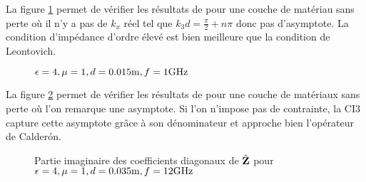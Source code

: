       La figure \ref{fig:imp_fourier:plan:hoppe:33:hoibc} permet de vérifier les résultats de \cite[p.~33]{hoppe_impedance_1995} pour une couche de matériau sans perte où il n'y a pas de \(k_x\) réel tel que \(k_3d=\frac{\pi}{2} + n \pi\) donc pas d'asymptote.
      La condition d'impédance d'ordre élevé est bien meilleure que la condition de Leontovich.
      \begin{figure}[!hbt]
        \centering
        
        \caption[Partie imaginaire de l'opérateur de Calderón, comparé avec les approximations CI0, CI3 pour une couche plane de matériau de Hoppe \& Rahmat-Samii, avec ondes évanescentes]{\(\epsilon = 4, \mu = 1, d=0.015\text{m}, f=1\text{GHz}\)}
        \label{fig:imp_fourier:plan:hoppe:33:hoibc}
      \end{figure}
      \begin{table}[!hbt]
        \centering
        \caption{Coefficients associés à la figure \ref{fig:imp_fourier:plan:hoppe:33:hoibc}}
        \label{tab:imp_fourier:plan:hoppe:33:hoibc}
      \end{table}

      \FloatBarrier

      La figure \ref{fig:imp_fourier:plan:soudais:hoibc} permet de vérifier les résultats de \cite[p.~11]{soudais_3d_2017} pour une couche de matériaux sans perte où l'on remarque une asymptote.
      Si l'on n'impose pas de contrainte, la CI3 capture cette asymptote grâce à son dénominateur et approche bien l'opérateur de Calderón.

      \begin{figure}[!hbt]
          \centering
          
          \caption[Partie imaginaire de l'opérateur de Calderón, comparé avec les approximations CI0, CI3 pour une couche plane de matériau sans pertes de P.~Soudais]{Partie imaginaire des coefficients diagonaux de \(\hat{\mathbf{Z}}\) pour \(\epsilon = 4, \mu = 1, d=0.035\text{m}, f=12\text{GHz}\)}
          \label{fig:imp_fourier:plan:soudais:hoibc}
      \end{figure}

      \begin{table}[!hbt]
        \centering
        \caption{Coefficients associés à la figure \ref{fig:imp_fourier:plan:soudais:hoibc}}
        \label{tab:imp_fourier:plan:soudais:hoibc}
      \end{table}

